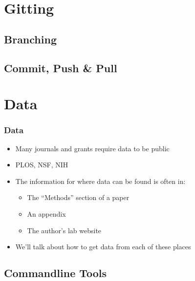 \documentclass[14pt]{beamer}
\begin{document}
\section{Gitting}



\subsection{Branching}

\subsection{Commit, Push \& Pull}

\section{Data}

\begin{frame}
\frametitle{Data}
\begin{itemize}
	\item<+-> Many journals and grants require data to be public
	\item<+-> PLOS, NSF, NIH
	\item<+-> The information for where data can be found is often in:
	\begin{itemize}
		\item<+-> The ``Methods'' section of a paper
		\item<+-> An appendix
		\item<+-> The author's lab website
	\end{itemize}
	\item<+-> We'll talk about how to get data from each of these places 
\end{itemize}
\end{frame}

\subsection{Commandline Tools}
\end{document}
